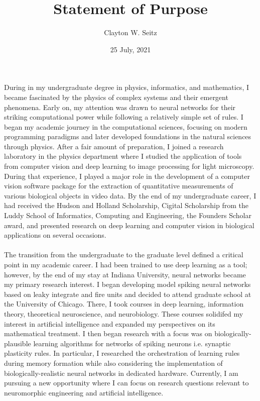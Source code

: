 \documentclass{article}
\title{Statement of Purpose}
\author{Clayton W. Seitz}
\date{25 July, 2021}
\begin{document}
  \maketitle%
\vspace{0.4in}

\indent During in my undergraduate degree in physics, informatics, and mathematics, I became fascinated by the physics of complex systems and their emergent phenomena. Early on, my attention was drawn to neural networks for their striking computational power while following a relatively simple set of rules. I began my academic journey in the computational sciences, focusing on modern programming paradigms and later developed foundations in the natural sciences through physics. After a fair amount of preparation, I joined a research laboratory in the physics department where I studied the application of tools from computer vision and deep learning to image processing for light microscopy. During that experience, I played a major role in the development of a computer vision software package for the extraction of quantitative measurements of various biological objects in video data. By the end of my undergraduate career, I had received the Hudson and Holland Scholarship, Cigital Scholarship from the Luddy School of Informatics, Computing and Engineering, the Founders Scholar award, and presented research on deep learning and computer vision in biological applications on several occasions.\\
\\
\indent  The transition from the undergraduate to the graduate level defined a critical point in my academic career. I had been trained to use deep learning as a tool; however, by the end of my stay at Indiana University, neural networks became my primary research interest. I began developing model spiking neural networks based on leaky integrate and fire units and decided to attend graduate school at the University of Chicago. There, I took courses in deep learning, information theory, theoretical neuroscience, and neurobiology. These courses solidifed my interest in artificial intelligence and expanded my perspectives on its mathematical treatment. I then began research with a focus was on biologically-plausible learning algorithms for networks of spiking neurons i.e. synaptic plasticity rules. In particular, I researched the orchestration of learning rules during memory formation while also considering the implementation of biologically-realistic neural networks in dedicated hardware. Currently, I am pursuing a new opportunity where I can focus on research questions relevant to neuromorphic engineering and artificial intelligence.\\
\end{document}
